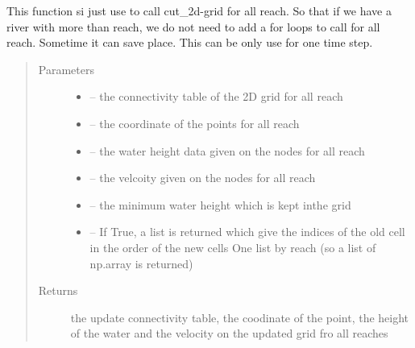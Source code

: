 \documentclass[letterpaper,10pt,english]{sphinxmanual}
\begin{document}

\begin{fulllineitems}
\label{\detokenize{index:src.manage_grid_8.cut_2d_grid_all_reach}}
This function si just use to call cut\_2d-grid for all reach. So that if we have a river with more than reach, we
do not need to add a for loops to call for all reach. Sometime it can save place. This can be only use for one
time step.
\begin{quote}\begin{description}
\item[{Parameters}] \leavevmode\begin{itemize}
\item {} 
 -- the connectivity table of the 2D grid for all reach

\item {} 
 -- the coordinate of the points for all reach

\item {} 
 -- the water height data given on the nodes for all reach

\item {} 
 -- the velcoity given on the nodes for all reach

\item {} 
 -- the minimum water height which is kept inthe grid

\item {} 
 -- If True, a list is returned which give the indices of the old cell in the order of the new cells
One list by reach (so a list of np.array is returned)

\end{itemize}

\item[{Returns}] \leavevmode
the update connectivity table, the coodinate of the point, the height of the water and the
velocity on the updated grid fro all reaches

\end{description}\end{quote}

\end{fulllineitems}
\end{document}
